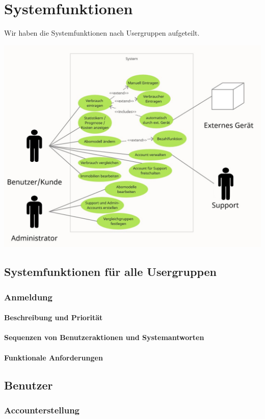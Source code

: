 \section{Systemfunktionen}
Wir haben die Systemfunktionen nach Usergruppen aufgeteilt. 

\includegraphics[scale=0.5]{UC.jpg}

\subsection{Systemfunktionen für alle Usergruppen}
\subsubsection{Anmeldung}
\paragraph{Beschreibung und Priorität}
\paragraph{Sequenzen von Benutzeraktionen und Systemantworten}
\paragraph{Funktionale Anforderungen}

\subsection{Benutzer}
\subsubsection{Accounterstellung}\label{acc}
